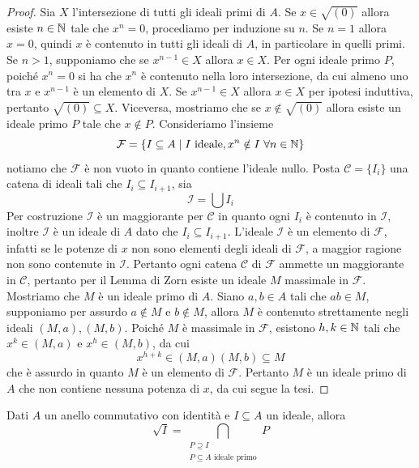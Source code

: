 \documentclass[11pt]{scrartcl}
\begin{document}
	\begin{proof}
		Sia $X$ l'intersezione di tutti gli ideali primi di $A$. 
		Se $x \in \sqrt{(0)}$ allora esiste $n \in \mathbb N$ tale che $x^n = 0$, procediamo
		per induzione su $n$. Se $n = 1$ allora $x = 0$, quindi $x$ è contenuto 
		in tutti gli ideali di $A$, in particolare in quelli primi. Se $n > 1$, 
		supponiamo che se $x^{n - 1} \in X$ allora $x \in X$.
		Per ogni ideale primo $P$, poiché $x^n = 0$ si ha che $x^n$ è contenuto nella
		loro intersezione, da cui almeno uno tra $x$ e $x^{n - 1}$ è un elemento
		di $X$. Se $x^{n - 1} \in X$ allora $x \in X$ per ipotesi induttiva, pertanto 
		$\sqrt{(0)} \subseteq X$. Viceversa, mostriamo che se $x \notin \sqrt{(0)}$
		allora esiste un ideale primo $P$ tale che $x \notin P$. Consideriamo 
		l'insieme
		\[
		\mathcal{F} = \{I \subseteq A \mid I \text{ ideale}, x^n \notin I
		~\forall n \in \mathbb N\}
		\]
		notiamo che $\mathcal{F}$ è non vuoto in quanto contiene l'ideale nullo.
		Posta $\mathscr{C} = \{I_i\}$ una catena di ideali tali che $I_i \subseteq I_{i + 1}$,
		sia
		\[
		\mathcal{I} = \bigcup I_i
		\]
		Per costruzione $\mathcal{I}$ è un maggiorante per $\mathscr{C}$ in quanto
		ogni $I_i$ è contenuto in $\mathcal{I}$, inoltre $\mathcal{I}$
		è un ideale di $A$ dato che $I_i \subseteq I_{i + 1}$. L'ideale $\mathcal{I}$
		è un elemento di $\mathcal{F}$, infatti se le potenze di $x$ non sono elementi
		degli ideali di $\mathcal{F}$, a maggior ragione non sono contenute in $\mathcal{I}$.
		Pertanto ogni catena $\mathscr{C}$ di $\mathcal{F}$ ammette un maggiorante 
		in $\mathscr{C}$, pertanto per il Lemma di Zorn esiste un ideale $M$ massimale
		in $\mathcal{F}$. Mostriamo che $M$ è un ideale primo di $A$. Siano $a, b \in A$
		tali che $ab \in M$, supponiamo per assurdo $a \notin M$ e $b \notin M$,
		allora $M$ è contenuto strettamente negli ideali $(M, a), (M, b)$. Poiché
		$M$ è massimale in $\mathcal{F}$, esistono $h, k \in \mathbb N$ tali che $x^k \in (M, a)$
		e $x^h \in (M, b)$, da cui
		\[
		x^{h + k} \in (M, a)(M, b) \subseteq M
		\]
		che è assurdo in quanto $M$ è un elemento di $\mathcal{F}$. Pertanto 
		$M$ è un ideale primo di $A$ che non contiene nessuna potenza di $x$, 
		da cui segue la tesi.
	\end{proof}
	
	\begin{corollary}
		Dati $A$ un anello commutativo con identità e $I\subseteq A$ un ideale, 
		allora
		\[
		\sqrt{I} = \bigcap_{\substack{P\supseteq I\\ P \subseteq A\text{ ideale primo}}}P
		\]
	\end{corollary}
	
\end{document}
